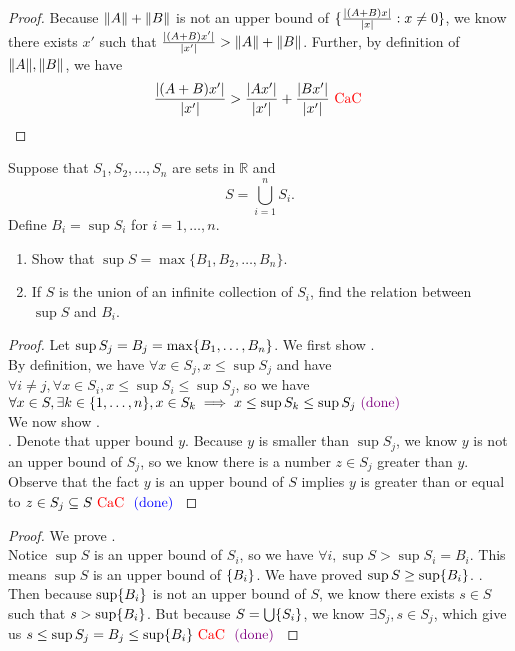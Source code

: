 \documentclass{report}
\begin{document}
\begin{proof}
Because $\| A \|+\| B \|$ is not an upper bound of $\{ \frac{|(A+B)x|}{|x|}:x\neq 0 \}$, we know there exists $x'$ such that  $\frac{|(A+B)x'|}{|x'|}>\| A \|+\| B \|$. Further, by definition of $\| A \|,\| B \|$, we have
\begin{equation}
\frac{|(A+B)x'|}{|x'|}>\frac{|Ax'|}{|x'|}+\frac{|Bx'|}{|x'|}\text{ \textcolor{red}{CaC} }
\end{equation}
\end{proof}

\begin{question}{}{}
Suppose that \(S_1, S_2, \ldots, S_n\) are sets in \(\mathbb{R}\) and 
\[ S = \bigcup_{i=1}^{n} S_i. \]
Define \(B_i = \sup S_i\) for \(i = 1, \ldots, n\).

\begin{enumerate}
    \item Show that \(\sup S = \max\{B_1, B_2, \ldots, B_n\} \).
    \item If \(S\) is the union of an infinite collection of \(S_i\), find the relation between \(\sup S\) and \(B_i\).
\end{enumerate}
\end{question}
\begin{proof}
Let $\sup S_j=B_j=\max \{ B_1,\dots, B_n \}$. We first show .\\

By definition, we have $\forall x\in S_j,x\leq \sup S_j$ and have $\forall i \neq j, \forall x \in S_i, x\leq \sup S_i\leq \sup S_j $, so we have $\forall x\in S, \exists k \in \{ 1,\dots, n \}, x \in S_k \implies x\leq \sup S_k\leq \sup S_j\textcolor{violet}{\text{ (done) }}$\\

We now show  .\\

. Denote that upper bound $y$. Because $y$ is smaller than $\sup S_j$, we know $y$ is not an upper bound of $S_j$, so we know there is a number  $z \in S_j$ greater than $y$. Observe that the fact $y$ is an upper bound of $S$ implies  $y$ is greater than or equal to $z \in S_j\subseteq S\text{ \textcolor{red}{CaC} }\textcolor{blue}{\text{ (done) }}$
\end{proof}
\begin{proof}
  We prove .\\

  Notice $\sup S$ is an upper bound of $S_i$, so we have $\forall i, \sup S>\sup S_i=B_i$. This means $\sup S$ is an upper bound of $\{ B_i \}$. We have proved $\sup S\geq \sup \{ B_i \}$. . Then because $\sup \{ B_i \}$ is not an upper bound of $S$, we know there exists  $s \in S$ such that $s>\sup \{ B_i \}$. But because $S=\bigcup \{ S_i \}$, we know $\exists S_j,s \in S_j$, which give us $s\leq \sup S_j=B_j\leq \sup \{ B_i \}\text{ \textcolor{red}{CaC} }\textcolor{violet}{\text{ (done) }}$
\end{proof}
\end{document}
